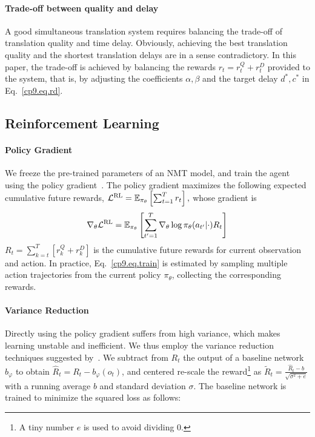 \paragraph{Trade-off between quality and delay}
A good simultaneous translation system requires balancing the trade-off of translation quality and time delay. Obviously, achieving the best translation quality and the shortest translation delays are in a sense contradictory. In this paper, the trade-off is achieved by balancing the rewards $r_t = r_t^Q + r_t^D$ provided to the system, that is, by adjusting the coefficients $\alpha,\beta$ and the target delay $d^*, c^*$ in Eq.~\eqref{cp9.eq.rd}. 

\subsection{Reinforcement Learning}

\paragraph{Policy Gradient}
We freeze the pre-trained parameters of an NMT model, and train the agent using the policy gradient~\cite{williams1992simple}. The policy gradient maximizes the following expected cumulative future rewards,
$     \mathcal{L}^{\text{RL}} = \mathbb{E}_{\pi_{\theta}}\left[\sum_{t=1}^T r_t\right], $ whose gradient is 
\begin{equation}
\label{cp9.eq.train}
   \nabla_{\theta}\mathcal{L}^{\text{RL}}=\mathbb{E}_{\pi_{\theta}}\left[\sum_{t'=1}^T\nabla_{\theta}\log \pi_{\theta}(a_{t'}|\cdot) R_t\right]
\end{equation}
$R_t=\sum_{k=t}^T\left[r_k^Q + r_k^D\right]$ is the cumulative future rewards for current observation and action. %
In practice, Eq.~\eqref{cp9.eq.train} is estimated by sampling multiple action trajectories from the current policy $\pi_{\theta}$, collecting the corresponding rewards.

\paragraph{Variance Reduction}
Directly using the policy gradient suffers from high variance, which makes learning unstable and inefficient. We thus employ the variance reduction techniques suggested by~. We subtract from $R_t$ the output of a baseline network $b_{\varphi}$ to obtain $\hat{R}_t = R_t - b_{\varphi}\left(o_t\right)$, and centered re-scale the reward\footnote{A tiny number $e$ is used to avoid dividing $0$.} as $\tilde{R}_t = \frac{\hat{R}_t - b}{\sqrt{\sigma^2+e}}$ with a running average $b$ and standard deviation $\sigma$. The baseline network is trained to minimize the squared loss as follows:

